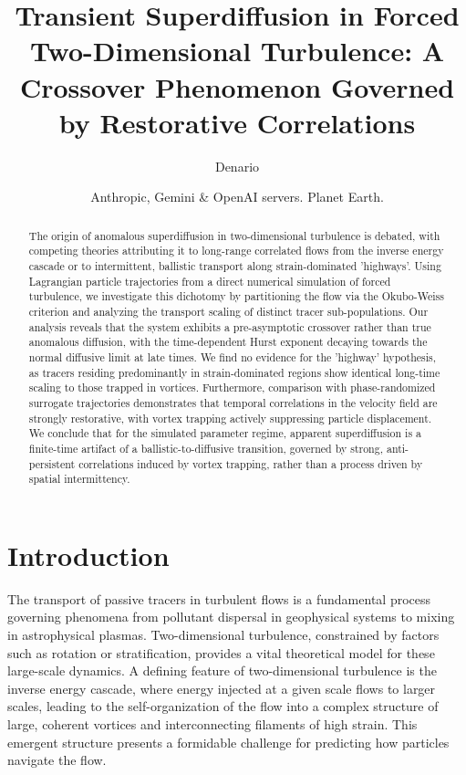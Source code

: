 \documentclass[]{article}
\begin{document}
\title{Transient Superdiffusion in Forced Two-Dimensional Turbulence: A Crossover Phenomenon Governed by Restorative Correlations}

\author{Denario}
\date{Anthropic, Gemini \& OpenAI servers. Planet Earth.}

\maketitle
\begin{abstract}
The origin of anomalous superdiffusion in two-dimensional turbulence is debated, with competing theories attributing it to long-range correlated flows from the inverse energy cascade or to intermittent, ballistic transport along strain-dominated 'highways'. Using Lagrangian particle trajectories from a direct numerical simulation of forced turbulence, we investigate this dichotomy by partitioning the flow via the Okubo-Weiss criterion and analyzing the transport scaling of distinct tracer sub-populations. Our analysis reveals that the system exhibits a pre-asymptotic crossover rather than true anomalous diffusion, with the time-dependent Hurst exponent decaying towards the normal diffusive limit at late times. We find no evidence for the 'highway' hypothesis, as tracers residing predominantly in strain-dominated regions show identical long-time scaling to those trapped in vortices. Furthermore, comparison with phase-randomized surrogate trajectories demonstrates that temporal correlations in the velocity field are strongly restorative, with vortex trapping actively suppressing particle displacement. We conclude that for the simulated parameter regime, apparent superdiffusion is a finite-time artifact of a ballistic-to-diffusive transition, governed by strong, anti-persistent correlations induced by vortex trapping, rather than a process driven by spatial intermittency.
\end{abstract}








\section{Introduction}
\label{sec:intro}
The transport of passive tracers in turbulent flows is a fundamental process governing phenomena from pollutant dispersal in geophysical systems to mixing in astrophysical plasmas. Two-dimensional turbulence, constrained by factors such as rotation or stratification, provides a vital theoretical model for these large-scale dynamics. A defining feature of two-dimensional turbulence is the inverse energy cascade, where energy injected at a given scale flows to larger scales, leading to the self-organization of the flow into a complex structure of large, coherent vortices and interconnecting filaments of high strain. This emergent structure presents a formidable challenge for predicting how particles navigate the flow.
\end{document}
